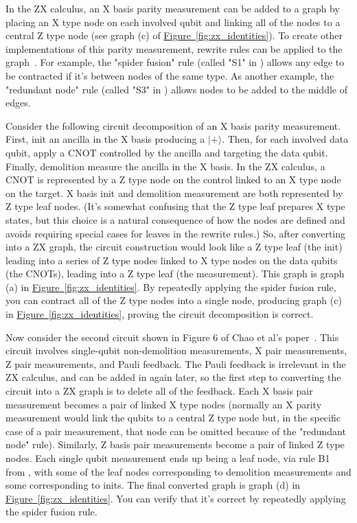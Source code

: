 \documentclass[onecolumn,unpublished,a4paper]{quantumarticle}
\theoremstyle{definition}
\theoremstyle{definition}
\theoremstyle{definition}
\newcommand{\fig}[1]{\hyperref[fig:#1]{Figure~\ref*{fig:#1}}}
\begin{document}
In the ZX calculus, an X basis parity measurement can be added to a graph by placing an X type node on each involved qubit and linking all of the nodes to a central Z type node (see graph (c) of \fig{zx_identities}).
To create other implementations of this parity measurement, rewrite rules can be applied to the graph~\cite{backens2016simplifiedzx}.
For example, the "spider fusion" rule (called "S1" in \cite{backens2016simplifiedzx}) allows any edge to be contracted if it's between nodes of the same type.
As another example, the "redundant node" rule (called "S3" in \cite{backens2016simplifiedzx}) allows nodes to be added to the middle of edges.

Consider the following circuit decomposition of an X basis parity measurement.
First, init an ancilla in the X basis producing a $|+\rangle$.
Then, for each involved data qubit, apply a CNOT controlled by the ancilla and targeting the data qubit.
Finally, demolition measure the ancilla in the X basis.
In the ZX calculus, a CNOT is represented by a Z type node on the control linked to an X type node on the target.
X basis init and demolition measurement are both represented by Z type leaf nodes.
(It's somewhat confusing that the Z type leaf prepares X type states, but this choice is a natural consequence of how the nodes are defined and avoids requiring special cases for leaves in the rewrite rules.)
So, after converting into a ZX graph, the circuit construction would look like a Z type leaf (the init) leading into a series of Z type nodes linked to X type nodes on the data qubits (the CNOTs), leading into a Z type leaf (the measurement).
This graph is graph (a) in \fig{zx_identities}.
By repeatedly applying the spider fusion rule, you can contract all of the Z type nodes into a single node, producing graph (c) in \fig{zx_identities}, proving the circuit decomposition is correct.

Now consider the second circuit shown in Figure 6 of Chao et al's paper~\cite{chao2020optimization}.
This circuit involves single-qubit non-demolition measurements, X pair measurements, Z pair measurements, and Pauli feedback.
The Pauli feedback is irrelevant in the ZX calculus, and can be added in again later, so the first step to converting the circuit into a ZX graph is to delete all of the feedback.
Each X basis pair measurement becomes a pair of linked X type nodes (normally an X parity measurement would link the qubits to a central Z type node but, in the specific case of a pair measurement, that node can be omitted because of the "redundant node" rule).
Similarly, Z basis pair measurements become a pair of linked Z type nodes.
Each single qubit measurement ends up being a leaf node, via rule B1 from \cite{backens2016simplifiedzx}, with some of the leaf nodes corresponding to demolition measurements and some corresponding to inits.
The final converted graph is graph (d) in \fig{zx_identities}.
You can verify that it's correct by repeatedly applying the spider fusion rule.
\end{document}
